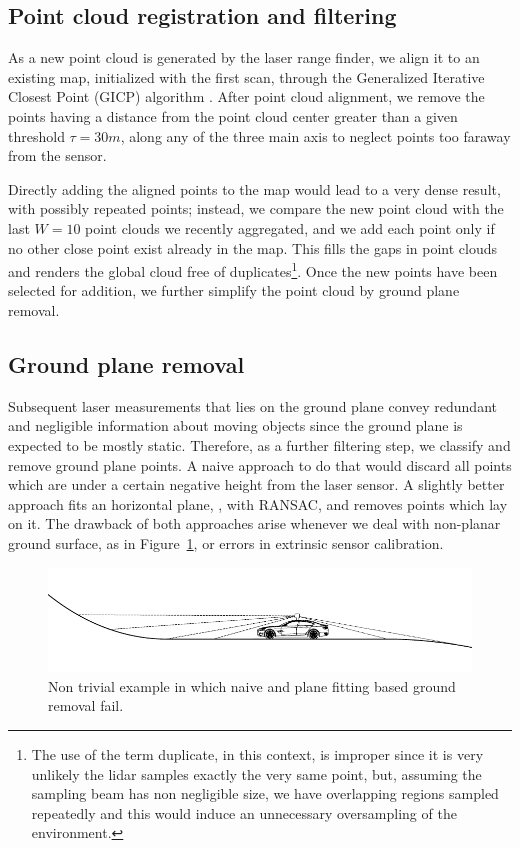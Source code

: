 \subsection{Point cloud registration and filtering}
As a new point cloud is generated by the laser range finder, we align it to an existing map, initialized with the first scan, through the Generalized Iterative Closest Point (GICP) algorithm \cite{segal2009generalized}.
%
After point cloud alignment, we remove the points having a distance from the point cloud center greater than a given threshold $\tau = 30m$, along any of the three main axis to neglect points too faraway from the sensor.

Directly adding the aligned points to the map would lead to a very dense result, with possibly repeated points; instead, we compare the new point cloud with the last $W = 10$ 
point clouds we recently aggregated, and we add each point only if no other close point exist already in the map. This fills the gaps in point clouds and renders the global cloud free of duplicates\footnote{The use of the term duplicate, in this context, is improper since it is very unlikely the lidar samples exactly the very same point, but, assuming the sampling beam has non negligible size, we have overlapping regions sampled repeatedly and this would induce an unnecessary oversampling of the environment.}. Once the new points have been selected for addition, we further simplify the point cloud by ground plane removal.


\subsection{Ground plane removal}
\label{sec:ground_removal}
Subsequent laser measurements that lies on the ground plane convey redundant and negligible information about moving objects since the ground plane is expected to be mostly static. Therefore, as a further filtering step, we classify and remove ground plane points. 
A naive approach to do that would discard all points which are under a certain negative height from the laser sensor. 
A slightly better approach fits an horizontal plane, \eg, with RANSAC, and removes points which lay on it.
The drawback of both approaches arise whenever we deal with non-planar ground surface, as in Figure~\ref{fig:nonplane}, or errors in extrinsic sensor calibration.

\begin{figure}
\includegraphics[width=0.99\columnwidth]{./img/ch-laser/./non-plane}
\caption{Non trivial example in which naive and plane fitting based ground removal fail.}
\label{fig:nonplane}
\end{figure}

